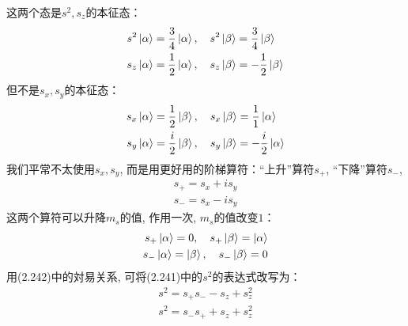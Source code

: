 这两个态是$s^2,s_z$的本征态：
\begin{subequations}
	\begin{align}
	s^2\Ket{\alpha} & = \frac{3}{4}\Ket{\alpha},\quad s^2\Ket{\beta} = \frac{3}{4}\Ket{\beta}\\
	s_z\Ket{\alpha} & =\frac{1}{2}\Ket{\alpha},\quad s_z\Ket{\beta} = -\frac{1}{2}\Ket{\beta}
	\end{align}
\end{subequations}
但不是$s_x,s_y$的本征态：
\begin{subequations}
	\begin{align}
	s_x\Ket{\alpha} & = \frac{1}{2}\Ket{\beta},\quad s_x\Ket{\beta} = \frac{1}{1}\Ket{\alpha}\\
	s_y\Ket{\alpha} & =\frac{i}{2}\Ket{\beta},\quad s_y\Ket{\beta} = -\frac{i}{2}\Ket{\alpha}
	\end{align}
\end{subequations}
我们平常不太使用$s_x,s_y$, 而是用更好用的阶梯算符：``上升”算符$s_+$, ``下降”算符$s_-$,
\begin{subequations}
	\begin{align}
	s_+ = s_x + is_y\\
	s_- = s_x - is_y
	\end{align}
\end{subequations}
这两个算符可以升降$m_s$的值, 作用一次, $m_s$的值改变$1$：
\begin{subequations}
	\begin{align}
	s_+\Ket{\alpha} = 0,\quad s_+\Ket{\beta} = \Ket{\alpha}\\
	s_-\Ket{\alpha} = \Ket{\beta},\quad s_-\Ket{\beta} = 0\\
	\end{align}
\end{subequations}
用(2.242)中的対易关系, 可将(2.241)中的$s^2$的表达式改写为：
\begin{subequations}
	\begin{align}
	s^2 = s_+s_- - s_z + s_z^2\\
	s^2 = s_-s_+ + s_z + s_z^2 
	\end{align}
\end{subequations}

